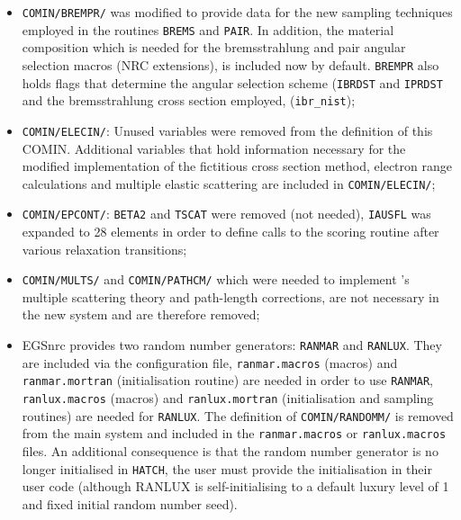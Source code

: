 \begin{itemize}
\item
{\tt COMIN/BREMPR/} was modified to provide
data for the new sampling techniques employed
in the routines {\tt BREMS} and {\tt PAIR}.
In addition, the material composition which
is needed for the bremsstrahlung and pair angular selection
macros (NRC extensions), is included now by default.
{\tt BREMPR} also holds flags that determine the
angular selection scheme ({\tt IBRDST} and {\tt IPRDST}
and the bremsstrahlung cross section employed, ({\tt ibr\_nist});
   

\item
{\tt COMIN/ELECIN/}: Unused variables were removed from the
definition of this COMIN. Additional variables that
hold information necessary for the modified implementation
of the fictitious cross section method, electron range
calculations and multiple elastic scattering are included
in {\tt COMIN/ELECIN/};

\item
{\tt COMIN/EPCONT/}: {\tt BETA2} and {\tt TSCAT} were removed
(not needed), {\tt IAUSFL} was expanded to 28 elements in order
to define calls to the scoring routine after various
relaxation transitions;
   


\item
{\tt COMIN/MULTS/} and {\tt COMIN/PATHCM/} which were needed to implement
\Mol's multiple scattering theory and path-length corrections, are not
necessary in the new system and are therefore removed;
 

\item
EGSnrc provides two random number generators:
{\tt RANMAR}\cite{MZ91,Ma90a} and {\tt RANLUX}\cite{La94,Ja94}.
They are included
via the configuration file, {\tt ranmar.macros}
(macros) and {\tt ranmar.mortran} (initialisation routine)
are needed in order to use {\tt RANMAR}, {\tt ranlux.macros}
(macros) and {\tt ranlux.mortran} (initialisation and
sampling routines) are needed for {\tt RANLUX}. The definition
of {\tt COMIN/RANDOMM/} is removed from the main system and
included in the {\tt ranmar.macros} or {\tt ranlux.macros}
files. An additional consequence is that the random
number generator is no longer initialised in {\tt HATCH},
the user must provide the initialisation in their user code (although
RANLUX is self-initialising to a default luxury level of 1 and fixed
initial random number seed).
 



\end{itemize}

